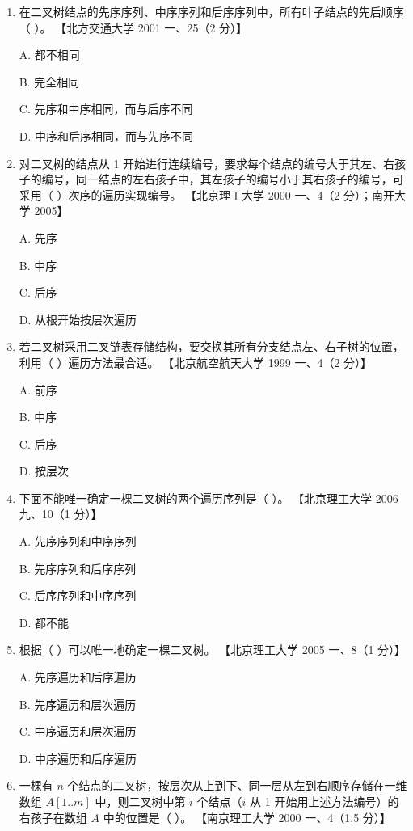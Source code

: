 \documentclass[lang=cn,newtx,10pt,scheme=chinese]{elegantbook}
\begin{document}
\begin{enumerate}
    \item 在二叉树结点的先序序列、中序序列和后序序列中，所有叶子结点的先后顺序（ ）。  
    【北方交通大学 2001 一、25（2 分）】 

    A. 都不相同  

    B. 完全相同  

    C. 先序和中序相同，而与后序不同  

    D. 中序和后序相同，而与先序不同  

    \item 对二叉树的结点从 1 开始进行连续编号，要求每个结点的编号大于其左、右孩子的编号，同一结点的左右孩子中，其左孩子的编号小于其右孩子的编号，可采用（ ）次序的遍历实现编号。  
    【北京理工大学 2000 一、4（2 分）；南开大学 2005】  

    A. 先序  

    B. 中序  

    C. 后序  

    D. 从根开始按层次遍历  

    \item 若二叉树采用二叉链表存储结构，要交换其所有分支结点左、右子树的位置，利用（ ）遍历方法最合适。  
    【北京航空航天大学 1999 一、4（2 分）】

    A. 前序  

    B. 中序  

    C. 后序  



    D. 按层次  

    \item 下面不能唯一确定一棵二叉树的两个遍历序列是（ ）。  
    【北京理工大学 2006 九、10（1 分）】  

    A. 先序序列和中序序列  

    B. 先序序列和后序序列  

    C. 后序序列和中序序列 

    D. 都不能  

    \item 根据（ ）可以唯一地确定一棵二叉树。  
    【北京理工大学 2005 一、8（1 分）】  

    A. 先序遍历和后序遍历  

    B. 先序遍历和层次遍历  

    C. 中序遍历和层次遍历  

    D. 中序遍历和后序遍历  

    \item 一棵有 $n$ 个结点的二叉树，按层次从上到下、同一层从左到右顺序存储在一维数组 $A[1..m]$ 中，则二叉树中第 $i$ 个结点（$i$ 从 1 开始用上述方法编号）的右孩子在数组 $A$ 中的位置是（ ）。  
    【南京理工大学 2000 一、4（1.5 分）】  


\end{enumerate}
\end{document}
